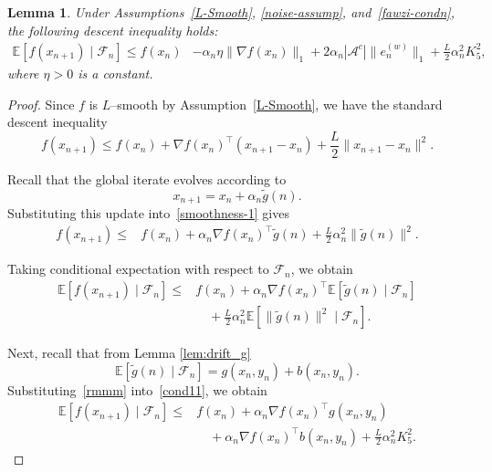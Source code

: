 \documentclass{article}
\newtheorem{lemma}[theorem]{Lemma}
\begin{document}
\begin{lemma}
\label{descentineq}
Under Assumptions~\ref{L-Smooth}, \ref{noise-assump}, and~\ref{fawzi-condn}, the following descent inequality holds:
\[
\begin{aligned}
    \mathbb{E}[f(x_{n+1}) \mid \mathcal{F}_n]
    \leq f(x_n)
    &- \alpha_n \eta \|\nabla f(x_n)\|_1
    + 2\alpha_n |\mathcal{A}^c| \|e_n^{(w)}\|_1
    + \frac{L}{2}\alpha_n^2 K_5^2,
\end{aligned}
\]
where $\eta > 0$ is a constant.
\end{lemma}

\begin{proof}
Since $f$ is $L$--smooth by Assumption~\ref{L-Smooth}, we have the standard descent inequality
\begin{equation}
    f(x_{n+1})
    \le
    f(x_n)
    +
    \nabla f(x_n)^\top (x_{n+1}-x_n)
    +
    \frac{L}{2}\|x_{n+1}-x_n\|^2 .
    \label{smoothness-1}
\end{equation}

Recall that the global iterate evolves according to
\[
    x_{n+1}
    =
    x_n + \alpha_n \widetilde g(n).
\]
Substituting this update into~\eqref{smoothness-1} gives
\begin{equation*}
\begin{split}
    f(x_{n+1})
    \le{}&
    f(x_n)
    +
    \alpha_n
    \nabla f(x_n)^\top \widetilde g(n)
    +
    \frac{L}{2}\alpha_n^2
    \|\widetilde g(n)\|^2 .
\end{split}
\end{equation*}

Taking conditional expectation with respect to $\mathcal{F}_n$, we obtain
\begin{equation}
\begin{split}
    \mathbb{E}[f(x_{n+1}) \mid \mathcal{F}_n]
    \le{}&
    f(x_n)
    +
    \alpha_n
    \nabla f(x_n)^\top
    \mathbb{E}[\widetilde g(n)\mid \mathcal{F}_n]
    \\
    &\quad
    +
    \frac{L}{2}\alpha_n^2
    \mathbb{E}[\|\widetilde g(n)\|^2 \mid \mathcal{F}_n].
\end{split}
\label{cond11}
\end{equation}



Next, recall that from Lemma \ref{lem:drift_g}
\begin{equation}
    \mathbb{E}[\widetilde g(n)\mid\mathcal{F}_n]
    =
    g(x_n,y_n)
    +
    b(x_n,y_n).
    \label{rmmm}
\end{equation}
Substituting~\eqref{rmmm} into~\eqref{cond11}, we obtain
\begin{equation*}
\begin{split}
    \mathbb{E}[f(x_{n+1}) \mid \mathcal{F}_n]
    \le{}&
    f(x_n)
    +
    \alpha_n
    \nabla f(x_n)^\top g(x_n,y_n)
    \\
    &\quad
    +
    \alpha_n
    \nabla f(x_n)^\top b(x_n,y_n)
    +
    \frac{L}{2}\alpha_n^2 K_5^2 .
\end{split}
\end{equation*}


\end{proof}
\end{document}
